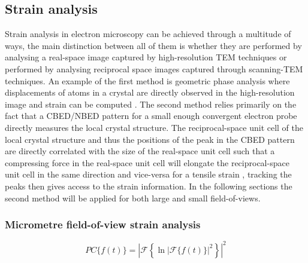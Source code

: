 \subsection{Strain analysis}
Strain analysis in electron microscopy can be achieved through a multitude of ways, the main distinction between all of them is whether they are performed by analysing a real-space image captured by high-resolution TEM techniques or performed by analysing reciprocal space images captured through scanning-TEM techniques. An example of the first method is geometric phase analysis where displacements of atoms in a crystal are directly observed in the high-resolution image and strain can be computed \cite{HYTCH1998131, hytchGEOMETRICPHASEANALYSIS1997, nguyenAtomicDefectsDoping2017}. The second method relies primarily on the fact that a CBED/NBED pattern for a small enough convergent electron probe directly measures the local crystal structure. The reciprocal-space unit cell of the local crystal structure and thus the positions of the peak in the CBED pattern are directly correlated with the size of the real-space unit cell such that a compressing force in the real-space unit cell will elongate the reciprocal-space unit cell in the same direction and vice-versa for a tensile strain \cite{ophusFourDimensionalScanningTransmission2019, vanwinkleRotationalDilationalReconstruction2023, kazmierczakStrainFieldsTwisted2021, hanStrainMappingTwoDimensional2018}, tracking the peaks then gives access to the strain information.  In the following sections the second method will be applied for both large and small field-of-views.

\subsubsection{Micrometre field-of-view strain analysis}
\begin{equation}
	PC\{f(t)\} = \left| \mathscr{F} \left\{ \ln{\left| \mathscr{F}\{f(t)\} \right|^2} \right\} \right|^2
	\label{eq:cepstrum}
\end{equation}

